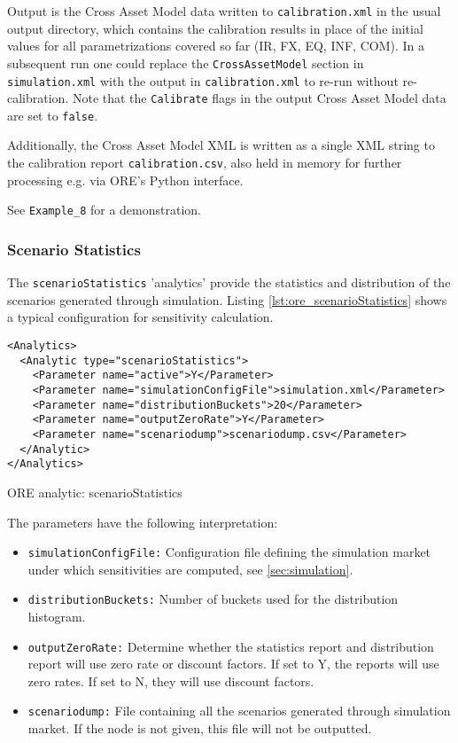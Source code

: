 {Output is the Cross Asset Model data written to {\tt calibration.xml} in the usual output directory, which contains the calibration
results in place of the initial values for all parametrizations covered so far (IR, FX, EQ, INF, COM). In a subsequent run one could replace
the {\tt CrossAssetModel} section in {\tt simulation.xml} with the output in {\tt calibration.xml} to re-run without re-calibration.
Note that the {\tt Calibrate} flags in the output Cross Asset Model data are set to {\tt false}.

Additionally, the Cross Asset Model XML is written as a single XML string to the calibration report {\tt calibration.csv}, also held in
memory for further processing e.g. via ORE's Python interface.

See {\tt Example\_8} for a demonstration.

\subsubsection{Scenario Statistics}

The {\tt scenarioStatistics} 'analytics' provide the statistics and distribution of the scenarios generated through simulation. Listing \ref{lst:ore_scenarioStatistics}
shows a typical configuration for sensitivity calculation.

\begin{listing}[H]
\begin{verbatim}
<Analytics>
  <Analytic type="scenarioStatistics">
	<Parameter name="active">Y</Parameter>
	<Parameter name="simulationConfigFile">simulation.xml</Parameter>
	<Parameter name="distributionBuckets">20</Parameter>
	<Parameter name="outputZeroRate">Y</Parameter>
	<Parameter name="scenariodump">scenariodump.csv</Parameter>
  </Analytic>
</Analytics>
\end{verbatim}
\caption{ORE analytic: scenarioStatistics}
\label{lst:ore_scenarioStatistics}
\end{listing}

The parameters have the following interpretation:

\begin{itemize}
\item {\tt simulationConfigFile:} Configuration file defining the simulation market under which sensitivities are computed,
  see \ref{sec:simulation}.
\item {\tt distributionBuckets:} Number of buckets used for the distribution histogram.
\item {\tt outputZeroRate:} Determine whether the statistics report and distribution report will use zero rate or discount factors. If set to Y, the reports will use zero rates. If set to N, they will use discount factors.
\item {\tt scenariodump:} File containing all the scenarios generated through simulation market. If the node is not given, this file will not be outputted.
\end{itemize}

}
